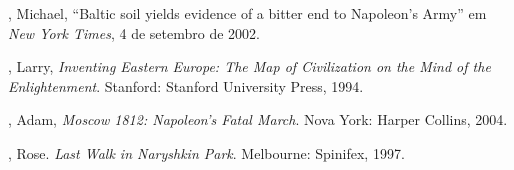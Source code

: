 \begin{bibliohedra}
, Michael, ``Baltic soil yields evidence of a bitter end to
Napoleon's Army'' em \textit{New York Times}, 4 de setembro de 2002.

, Larry, \textit{Inventing Eastern Europe: The Map of Civilization on
the Mind of the Enlightenment}. Stanford: Stanford University Press,
1994.

, Adam, \textit{Moscow 1812: Napoleon's Fatal March}. Nova York:
Harper Collins, 2004. \EP[1]

, Rose. \textit{Last Walk in Naryshkin Park}. Melbourne:
Spinifex, 1997.
\end{bibliohedra}



